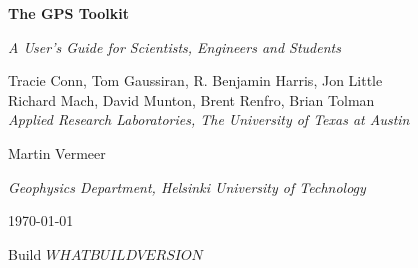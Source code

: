 
\begin{titlepage}

\begin{center}

\addvspace{30pt}


{ \Huge\bf The GPS Toolkit }

\addvspace{10pt}

{ \huge\it A User's Guide for Scientists, Engineers and Students }

\addvspace{60pt}

Tracie Conn, Tom Gaussiran, R. Benjamin Harris, Jon Little \\
Richard Mach, David Munton, Brent Renfro, Brian Tolman \\

\addvspace{3pt}
{ \it Applied Research Laboratories, The University of Texas at Austin}

\addvspace{10pt}

Martin Vermeer

\addvspace{3pt}
{ \it Geophysics Department, Helsinki University of Technology}

\addvspace{60pt}

\today



Build $WHATBUILDVERSION$

\end {center}

\end{titlepage}


